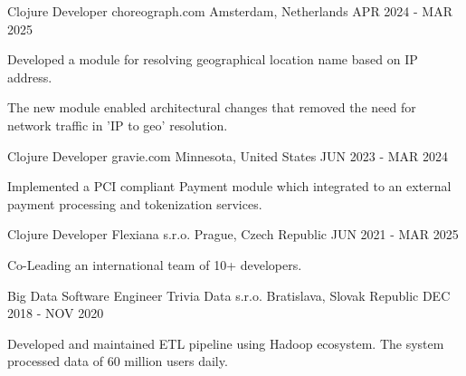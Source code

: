 

\begin{cventries}

  \cventry
    {Clojure Developer} %
    {choreograph.com} %
    {Amsterdam, Netherlands} %
    {APR 2024 - MAR 2025} %
    {
      \begin{cvitems} %
        \item {Developed a module for resolving geographical location name based on IP address.}
        \item {The new module enabled architectural changes that removed the need for network traffic in 'IP to geo' resolution.}
      \end{cvitems}
    }

  \cventry
    {Clojure Developer} %
    {gravie.com} %
    {Minnesota, United States} %
    {JUN 2023 - MAR 2024} %
    {
      \begin{cvitems} %
        \item {Implemented a PCI compliant Payment module which integrated to an external payment processing and tokenization services.}
      \end{cvitems}
    }

  \cventry
    {Clojure Developer} %
    {Flexiana s.r.o.} %
    {Prague, Czech Republic} %
    {JUN 2021 - MAR 2025} %
    {
      \begin{cvitems} %
        \item {Co-Leading an international team of 10+ developers.}
      \end{cvitems}
    }

  \cventry
    {Big Data Software Engineer} %
    {Trivia Data s.r.o.} %
    {Bratislava, Slovak Republic} %
    {DEC 2018 - NOV 2020} %
    {
      \begin{cvitems} %
        \item {Developed and maintained ETL pipeline using Hadoop ecosystem. The system processed data of 60 million users daily.}
      \end{cvitems}
    }


\end{cventries}
